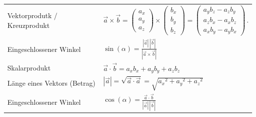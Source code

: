 \documentclass[
a4paper,
oneside,
landscape, 
8pt,
]{scrartcl}
\begin{document}
\begin{multicols*}{2}
\begin{tabbing}
	\begin{tabu} to \linewidth {l X}
		\toprule
		Vektorprodutk / Kreuzprodukt & $
		\vec{a}\times\vec{b}
		=
		\begin{pmatrix}a_x \\ a_y \\ a_z\end{pmatrix}
		\times
		\begin{pmatrix}b_x \\ b_y \\ b_z \end{pmatrix}
		=
		\begin{pmatrix}
		a_yb_z - a_zb_y \\
		a_zb_x - a_xb_z \\
		a_xb_y - a_yb_x
		\end{pmatrix}\,.
		$ \\
		Eingeschlossener Winkel & $\sin(\alpha) = \frac{|\vec{a}|\, |\vec{b}|}{|\vec{a}\times\vec{b}|}$\\
		Skalarprodukt & $\vec a \cdot \vec b = a_x b_x + a_y  b_y +  a_z  b_z$ \\
		Länge eines Vektors (Betrag) & $| \vec a | = \sqrt{\vec a\cdot \vec a} = \sqrt{{a_x}^2+{a_y}^2+{a_z}^2}$ \\
		Eingeschlossener Winkel & $\cos (\alpha) = \frac{\vec a\cdot\vec b}{|\vec a|\,|\vec b|}$ \\
		\bottomrule
	\end{tabu}
\end{tabbing}



\end{multicols*}
\end{document}
